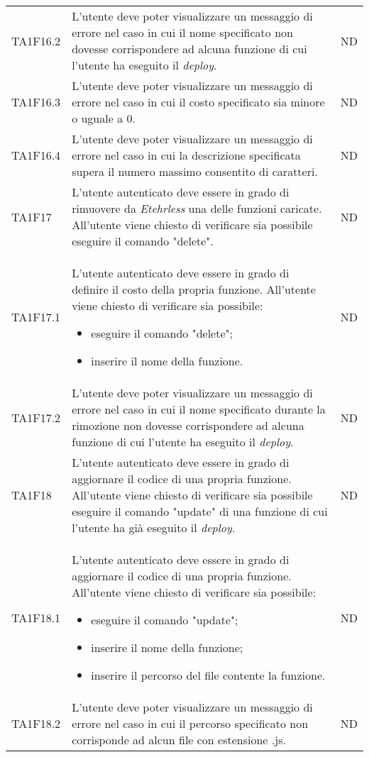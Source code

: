 \begin{longtable}{|C{1.5cm}|C{9cm}|C{3cm}|}
	TA1F16.2  &
	L’utente deve poter visualizzare un messaggio di errore nel caso in cui il nome specificato non dovesse corrispondere ad alcuna funzione di cui l'utente ha eseguito il \textit{deploy\glos}. &
	ND \\

	TA1F16.3  &
	L’utente deve poter visualizzare un messaggio di errore nel caso in cui il costo specificato sia minore o uguale a 0. &
	ND \\

	TA1F16.4  &
	L’utente deve poter visualizzare un messaggio di errore nel caso in cui la descrizione specificata supera il numero massimo consentito di caratteri. &
	ND \\

	TA1F17  &
	L'utente autenticato deve essere in grado di rimuovere da \textit{Etehrless} una delle funzioni caricate. All’utente viene chiesto di verificare sia possibile eseguire il comando "delete". &
	ND \\

	TA1F17.1  &
	L'utente autenticato deve essere in grado di definire il costo della propria funzione. All’utente viene chiesto di verificare sia possibile:
	\begin{itemize}
		\item eseguire il comando "delete";
		\item inserire il nome della funzione.
	\end{itemize} &
	ND \\[-5ex]

	TA1F17.2  &
	L’utente deve poter visualizzare un messaggio di errore nel caso in cui il nome specificato durante la rimozione non dovesse corrispondere ad alcuna funzione di cui l'utente ha eseguito il \textit{deploy\glos}. &
	ND \\

	TA1F18  &
	L'utente autenticato deve essere in grado di aggiornare il codice di una propria funzione. All’utente viene chiesto di verificare sia possibile eseguire il comando "update" di una funzione di cui l'utente ha già eseguito il \textit{deploy\glos}. &
	ND \\

	TA1F18.1  &
	L'utente autenticato deve essere in grado di aggiornare il codice di una propria funzione. All’utente viene chiesto di verificare sia possibile:
	\begin{itemize}
		\item eseguire il comando "update";
		\item inserire il nome della funzione;
		\item inserire il percorso del file contente la funzione.
	\end{itemize} &
	ND \\[-5ex]

	TA1F18.2  &
	L’utente deve poter visualizzare un messaggio di errore nel caso in cui il percorso specificato non corrisponde ad alcun file con estensione .js. &
	ND \\
	
\end{longtable}


